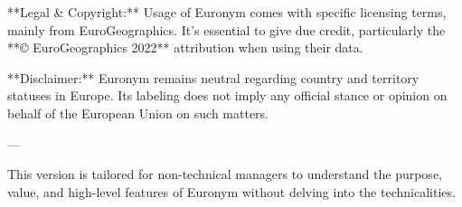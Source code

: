 **Legal & Copyright:**  
Usage of Euronym comes with specific licensing terms, mainly from EuroGeographics. It's essential to give due credit, particularly the **© EuroGeographics 2022** attribution when using their data.

**Disclaimer:**  
Euronym remains neutral regarding country and territory statuses in Europe. Its labeling does not imply any official stance or opinion on behalf of the European Union on such matters.

--- 

This version is tailored for non-technical managers to understand the purpose, value, and high-level features of Euronym without delving into the technicalities.